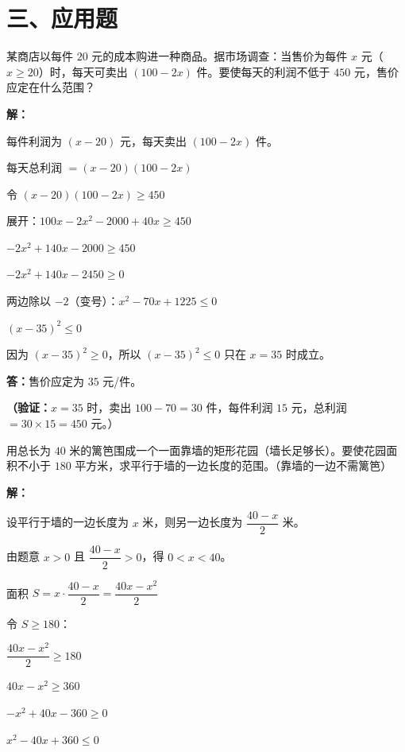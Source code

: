 \documentclass[12pt, a4paper]{ctexart}
\begin{document}
\section*{\textcolor{apppurple}{三、应用题}}

\begin{appbox}[【应用1】商品定价问题]
某商店以每件 $20$ 元的成本购进一种商品。据市场调查：当售价为每件 $x$ 元（$x \geq 20$）时，每天可卖出 $(100 - 2x)$ 件。要使每天的利润不低于 $450$ 元，售价应定在什么范围？
\end{appbox}

\textbf{解：}

每件利润为 $(x - 20)$ 元，每天卖出 $(100 - 2x)$ 件。

每天总利润 $= (x - 20)(100 - 2x)$

令 $(x - 20)(100 - 2x) \geq 450$

展开：$100x - 2x^2 - 2000 + 40x \geq 450$

$-2x^2 + 140x - 2000 \geq 450$

$-2x^2 + 140x - 2450 \geq 0$

两边除以 $-2$（变号）：$x^2 - 70x + 1225 \leq 0$

$(x - 35)^2 \leq 0$

因为 $(x - 35)^2 \geq 0$，所以 $(x - 35)^2 \leq 0$ 只在 $x = 35$ 时成立。

\textbf{答：}售价应定为 $35$ 元/件。

\textbf{（验证：}$x = 35$ 时，卖出 $100 - 70 = 30$ 件，每件利润 $15$ 元，总利润 $= 30 \times 15 = 450$ 元。）

\begin{appbox}[【应用2】围栏面积问题]
用总长为 $40$ 米的篱笆围成一个一面靠墙的矩形花园（墙长足够长）。要使花园面积不小于 $180$ 平方米，求平行于墙的一边长度的范围。（靠墙的一边不需篱笆）
\end{appbox}

\textbf{解：}

设平行于墙的一边长度为 $x$ 米，则另一边长度为 $\dfrac{40 - x}{2}$ 米。

由题意 $x > 0$ 且 $\dfrac{40 - x}{2} > 0$，得 $0 < x < 40$。

面积 $S = x \cdot \dfrac{40 - x}{2} = \dfrac{40x - x^2}{2}$

令 $S \geq 180$：

$\dfrac{40x - x^2}{2} \geq 180$

$40x - x^2 \geq 360$

$-x^2 + 40x - 360 \geq 0$

$x^2 - 40x + 360 \leq 0$
\end{document}

